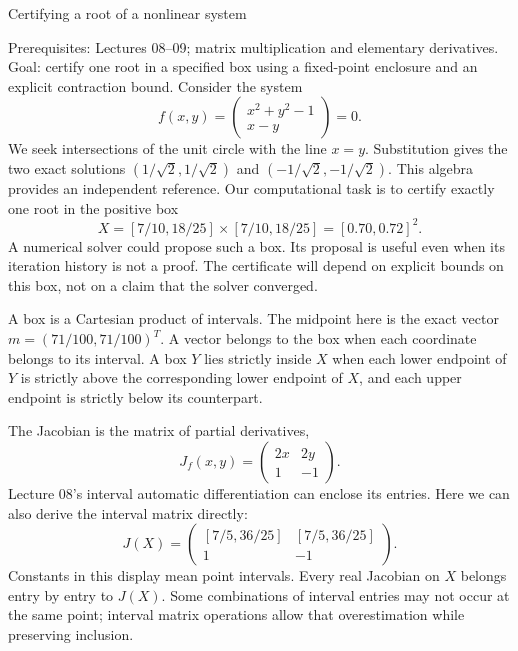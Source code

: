 \def\lecturenumber{10}


\opening{Certifying a root of a nonlinear system}{Prerequisites: Lectures 08--09; matrix multiplication and elementary derivatives.\newline
Goal: certify one root in a specified box using a fixed-point enclosure and an explicit contraction bound.}
Consider the system
\[
 f(x,y)=\begin{pmatrix}x^2+y^2-1\\x-y\end{pmatrix}=0.
\]
We seek intersections of the unit circle with the line $x=y$. Substitution
gives the two exact solutions $(1/\sqrt2,1/\sqrt2)$ and
$(-1/\sqrt2,-1/\sqrt2)$. This algebra provides an independent reference.
Our computational task is to certify exactly one root in the positive box
\[
               X=[7/10,18/25]\times[7/10,18/25]=[0.70,0.72]^2.
\]
A numerical solver could propose such a box. Its proposal is useful even
when its iteration history is not a proof. The certificate will depend on
explicit bounds on this box, not on a claim that the solver converged.

A box is a Cartesian product of intervals. The midpoint here is the exact
vector $m=(71/100,71/100)^T$. A vector belongs to the box when each
coordinate belongs to its interval. A box $Y$ lies strictly inside $X$ when
each lower endpoint of $Y$ is strictly above the corresponding lower
endpoint of $X$, and each upper endpoint is strictly below its counterpart.

The Jacobian is the matrix of partial derivatives,
\[
 J_f(x,y)=\begin{pmatrix}2x&2y\\1&-1\end{pmatrix}.
\]
Lecture 08's interval automatic differentiation can enclose its entries.
Here we can also derive the interval matrix directly:
\[
 J(X)=\begin{pmatrix}[7/5,36/25]&[7/5,36/25]\\1&-1\end{pmatrix}.
\]
Constants in this display mean point intervals. Every real Jacobian on $X$
belongs entry by entry to $J(X)$. Some combinations of interval entries
may not occur at the same point; interval matrix operations allow that
overestimation while preserving inclusion.

